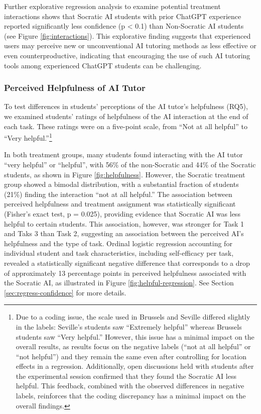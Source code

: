 \documentclass[
  11pt,
]{article}
\begin{document}
Further explorative regression analysis to examine potential treatment interactions shows that Socratic AI students with prior ChatGPT experience reported significantly less confidence (p \textless{} 0.1) than Non-Socratic AI students (see Figure \ref{fig:interactions}). This explorative finding suggests that experienced users may perceive new or unconventional AI tutoring methods as less effective or even counterproductive, indicating that encouraging the use of such AI tutoring tools among experienced ChatGPT students can be challenging.

\subsubsection{Perceived Helpfulness of AI Tutor}\label{perceived-helpfulness-of-ai-tutor}

To test differences in students' perceptions of the AI tutor's helpfulness (RQ5), we examined students' ratings of helpfulness of the AI interaction at the end of each task. These ratings were on a five-point scale, from ``Not at all helpful'' to ``Very helpful.''\footnote{Due to a coding issue, the scale used in Brussels and Seville differed slightly in the labels: Seville's students saw ``Extremely helpful'' whereas Brussels students saw ``Very helpful.'' However, this issue has a minimal impact on the overall results, as results focus on the negative labels (``not at all helpful'' or ``not helpful'') and they remain the same even after controlling for location effects in a regression. Additionally, open discussions held with students after the experimental session confirmed that they found the Socratic AI less helpful. This feedback, combined with the observed differences in negative labels, reinforces that the coding discrepancy has a minimal impact on the overall findings.}

In both treatment groups, many students found interacting with the AI tutor ``very helpful'' or ``helpful'', with 56\% of the non-Socratic and 44\% of the Socratic students, as shown in Figure \ref{fig:helpfulness}. However, the Socratic treatment group showed a bimodal distribution, with a substantial fraction of students (21\%) finding the interaction ``not at all helpful.'' The association between perceived helpfulness and treatment assignment was statistically significant (Fisher's exact test, p = 0.025), providing evidence that Socratic AI was less helpful to certain students. This association, however, was stronger for Task 1 and Taks 3 than Task 2, suggesting an association between the perceived AI's helpfulness and the type of task. Ordinal logistic regression accounting for individual student and task characteristics, including self-efficacy per task, revealed a statistically significant negative difference that corresponds to a drop of approximately 13 percentage points in perceived helpfulness associated with the Socratic AI, as illustrated in Figure \ref{fig:helpful-regression}. See Section \ref{sec:regress-confidence} for more details.
\end{document}
